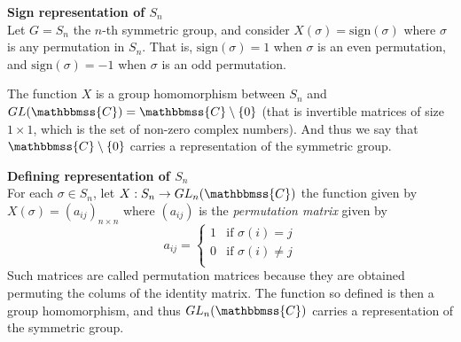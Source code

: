 \documentclass[12pt]{article}
\newcommand{\C}{\mathbbmss{C}}
\begin{document}
\textbf{Sign representation of $S_n$}\\
Let $G=S_n$ the $n$-th symmetric group, and consider $X(\sigma) = \mathrm{sign}(\sigma)$ where $\sigma$ is any permutation in $S_n$. 
That is, $\mathrm{sign}(\sigma)=1$ when $\sigma$ is an even permutation, and  $\mathrm{sign}(\sigma)=-1$ when $\sigma$ is an odd permutation.

The function $X$ is a group homomorphism between $S_n$ and $GL(\C)=\C \setminus\{0\}$ (that is invertible matrices of size $1\times1$, which is the set of non-zero complex numbers). And thus we say that $\C\setminus\{0\}$ carries a representation of the symmetric group. 

\textbf{Defining representation of $S_n$}\\
For each $\sigma \in S_n$, let $X:S_n\to GL_n(\C)$ the function given by $X(\sigma)=(a_{ij})_{n\times n}$ where $(a_{ij})$ is the \emph{permutation matrix} given by
\[
a_{ij}=\begin{cases}
1 & \text{if } \sigma(i)=j\\
0 & \text{if } \sigma(i)\ne j\\
\end{cases}
\]
Such matrices are called permutation matrices because they are obtained permuting the colums of the identity matrix. The function so defined is then a group homomorphism, and thus $GL_n(\C)$ carries a representation of the symmetric group.
\end{document}
